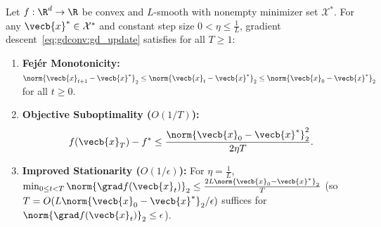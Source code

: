 \documentclass[../../../../master.tex]{subfiles}
\begin{document}
\begin{coremath}
\label{thm:gdconv:convex}
Let $f : \R^d \to \R$ be convex and $L$-smooth with nonempty minimizer set $\mathcal{X}^*$. For any $\vecb{x}^* \in \mathcal{X}^*$ and constant step size $0 < \eta \le \frac{1}{L}$, gradient descent~\eqref{eq:gdconv:gd_update} satisfies for all $T \ge 1$:
\begin{enumerate}
  \item \textbf{Fej\'er Monotonicity:} $\norm{\vecb{x}_{t+1} - \vecb{x}^*}_2 \le \norm{\vecb{x}_t - \vecb{x}^*}_2 \le \norm{\vecb{x}_0 - \vecb{x}^*}_2$ for all $t \ge 0$.
  \item \textbf{Objective Suboptimality ($O(1/T)$):}
  \begin{equation}
  \label{eq:gdconv:convex_rate}
    f(\vecb{x}_T) - f^* \le \frac{\norm{\vecb{x}_0 - \vecb{x}^*}_2^2}{2\eta T}.
  \end{equation}
  \item \textbf{Improved Stationarity ($O(1/\epsilon)$):} For $\eta = \frac{1}{L}$, $\min_{0 \le t < T}\norm{\grad f(\vecb{x}_t)}_2 \le \frac{2L\norm{\vecb{x}_0 - \vecb{x}^*}_2}{T}$ (so $T = O(L\norm{\vecb{x}_0-\vecb{x}^*}_2/\epsilon)$ suffices for $\norm{\grad f(\vecb{x}_t)}_2 \le \epsilon$).
\end{enumerate}
\end{coremath}
\end{document}
